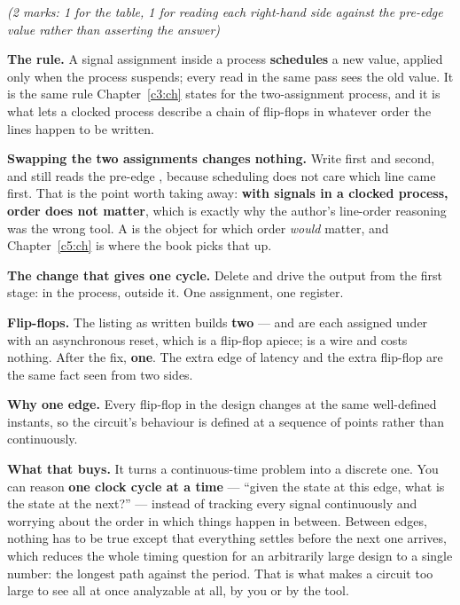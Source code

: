 {\itshape (2 marks: 1 for the table, 1 for reading each right-hand side against the pre-edge value
rather than asserting the answer)\par}

\medskip
\textbf{The rule.} A signal assignment inside a process \textbf{schedules} a new value, applied only
when the process suspends; every read in the same pass sees the old value. It is the same rule
Chapter~\ref{c3:ch} states for the two-assignment process, and it is what lets a clocked process
describe a chain of flip-flops in whatever order the lines happen to be written.

\textbf{Swapping the two assignments changes nothing.} Write  first and
 second, and  still reads the pre-edge ,
because scheduling does not care which line came first. That is the point worth taking away:
\textbf{with signals in a clocked process, order does not matter}, which is exactly why the author's
line-order reasoning was the wrong tool. A  is the object for which order
\emph{would} matter, and Chapter~\ref{c5:ch} is where the book picks that up. 

\textbf{The change that gives one cycle.} Delete  and drive the output from the first
stage:  in the process,  outside it. One assignment,
one register.

\textbf{Flip-flops.} The listing as written builds \textbf{two} ---  and
 are each assigned under  with an asynchronous reset, which
is a flip-flop apiece;  is a wire and costs nothing. After the fix,
\textbf{one}. The extra edge of latency and the extra flip-flop are the same fact seen from two
sides. 

\textbf{Why one edge.} Every flip-flop in the design changes at the same well-defined instants, so
the circuit's behaviour is defined at a sequence of points rather than continuously. 

\textbf{What that buys.} It turns a continuous-time problem into a discrete one. You can reason
\textbf{one clock cycle at a time} --- ``given the state at this edge, what is the state at the
next?'' --- instead of tracking every signal continuously and worrying about the order in which
things happen in between. Between edges, nothing has to be true except that everything settles
before the next one arrives, which reduces the whole timing question for an arbitrarily large design
to a single number: the longest path against the period. That is what makes a circuit too large to
see all at once analyzable at all, by you or by the tool. 

